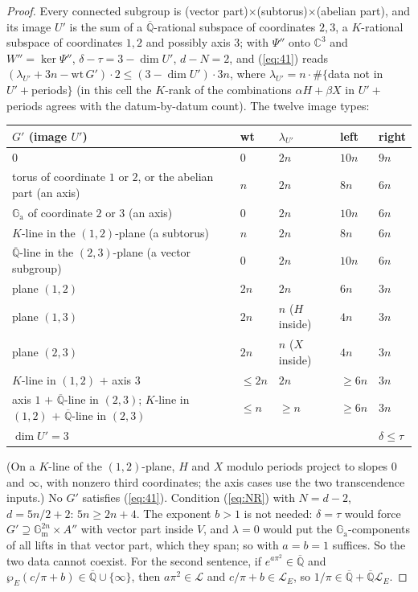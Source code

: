 \documentclass[11pt]{amsart}
\theoremstyle{definition}
\newcommand{\Qb}{\overline{\mathbb{Q}}}
\newcommand{\C}{\mathbb{C}}
\newcommand{\Ga}{\mathbb{G}_{\mathrm a}}
\newcommand{\Gm}{\mathbb{G}_{\mathrm m}}
\newcommand{\Lg}{\mathcal{L}}
\begin{document}
\begin{proof}
Every connected subgroup is (vector part)$\times$(subtorus)$\times$(abelian part), and its image $U'$ is the sum of a
$\Qb$-rational subspace of coordinates $2,3$, a $K$-rational subspace of coordinates $1,2$ and possibly axis $3$; with $\Psi''$ onto
$\C^3$ and $W''=\ker\Psi''$, $\delta-\tau=3-\dim U'$, $d-N=2$, and (\ref{eq:41}) reads $(\lambda_{U'}+3n-\mathrm{wt}\,G')\cdot2\le
(3-\dim U')\cdot3n$, where $\lambda_{U'}=n\cdot\#\{$data not in $U'+$periods$\}$ (in this cell the $K$-rank of the combinations
$\alpha H+\beta X$ in $U'+$periods agrees with the datum-by-datum count). The twelve image types:
\begin{center}
{\small
\begin{tabular}{lllll}
$G'$ (image $U'$) & wt & $\lambda_{U'}$ & left & right\\\hline
$0$ & $0$ & $2n$ & $10n$ & $9n$\\
torus of coordinate $1$ or $2$, or the abelian part (an axis) & $n$ & $2n$ & $8n$ & $6n$\\
$\Ga$ of coordinate $2$ or $3$ (an axis) & $0$ & $2n$ & $10n$ & $6n$\\
$K$-line in the $(1,2)$-plane (a subtorus) & $n$ & $2n$ & $8n$ & $6n$\\
$\Qb$-line in the $(2,3)$-plane (a vector subgroup) & $0$ & $2n$ & $10n$ & $6n$\\
plane $(1,2)$ & $2n$ & $2n$ & $6n$ & $3n$\\
plane $(1,3)$ & $2n$ & $n$ ($H$ inside) & $4n$ & $3n$\\
plane $(2,3)$ & $2n$ & $n$ ($X$ inside) & $4n$ & $3n$\\
$K$-line in $(1,2)$ $+$ axis $3$ & $\le2n$ & $2n$ & $\ge6n$ & $3n$\\
axis $1$ $+$ $\Qb$-line in $(2,3)$; $K$-line in $(1,2)$ $+$ $\Qb$-line in $(2,3)$ & $\le n$ & $\ge n$ & $\ge6n$ & $3n$\\
$\dim U'=3$ & & & & $\delta\le\tau$
\end{tabular}
}
\end{center}
(On a $K$-line of the $(1,2)$-plane, $H$ and $X$ modulo periods project to slopes $0$ and $\infty$, with nonzero third
coordinates; the axis cases use the two transcendence inputs.) No $G'$ satisfies (\ref{eq:41}). Condition (\ref{eq:NR}) with
$N=d-2$, $d=5n/2+2$: $5n\ge2n+4$. The exponent $b>1$ is not needed: $\delta=\tau$ would force $G'\supseteq\Gm^{2n}\times A''$
with vector part inside $V$, and $\lambda=0$ would put the $\Ga$-components of all lifts in that vector part, which they span;
so \cite[(7.2)]{W88} with $a=b=1$ suffices. So the two data cannot coexist. For the second sentence, if $e^{a\pi^2}\in\Qb$ and
$\wp_E(c/\pi+b)\in\Qb\cup\{\infty\}$, then $a\pi^2\in\Lg$ and $c/\pi+b\in\Lg_E$, so $1/\pi\in\Qb+\Qb\Lg_E$.
\end{proof}
\end{document}
